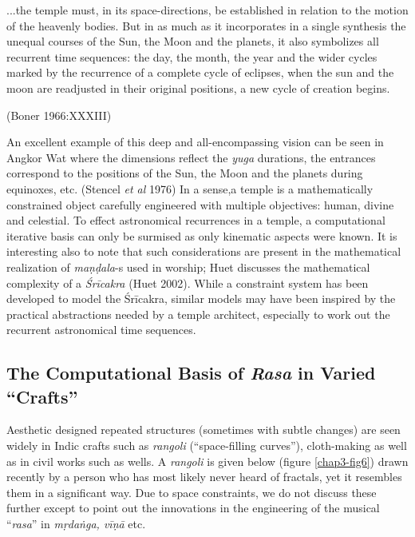 \begin{myquote}
...the temple must, in its space-directions, be established in relation to the motion of the heavenly bodies. But in as much as it incorporates in a single synthesis the unequal courses of the Sun, the Moon and the planets, it also symbolizes all recurrent time sequences: the day, the month, the year and the wider cycles marked by the recurrence of a complete cycle of eclipses, when the sun and the moon are readjusted in their original positions, a new cycle of creation begins. 

\hfill(Boner 1966:XXXIII)
\end{myquote}

An excellent example of this deep and all-encompassing vision can be seen in Angkor Wat where the dimensions reflect the \textsl{yuga} durations, the entrances correspond to the positions of the Sun, the Moon and the planets during equinoxes, etc. (Stencel \textsl{et al} 1976) In a sense,\break a temple is a mathematically constrained object carefully engineered with multiple objectives: human, divine and celestial. To effect astronomical recurrences in a temple, a computational iterative basis can only be surmised as only kinematic aspects were known. It is interesting also to note that such considerations are present in the mathematical realization of \textsl{maṇḍala}-s used in worship; Huet discusses the mathematical complexity of a \textsl{Śrīcakra} (Huet 2002). While a constraint system has been developed to model the Śrīcakra, similar models may have been inspired by the practical abstractions needed by a temple architect, especially to work out the recurrent astronomical time sequences.\\[-20pt]

\subsection{The Computational Basis of \textsl{Rasa} in Varied “Crafts”}\label{chap3-sec5.4}

Aesthetic designed repeated structures (sometimes with subtle changes) are seen widely in Indic crafts such as \textsl{rangoli} (“space-filling curves”), cloth-making as well as in civil works such as wells. A \textsl{rangoli} is given below (figure \ref{chap3-fig6}) drawn recently by a person who has most likely never heard of fractals, yet it resembles them in a significant way. Due to space constraints, we do not discuss these further except to point out the innovations in the engineering of the musical “\textsl{rasa}” in \textsl{mṛdaṅga, vīṇā} etc.

